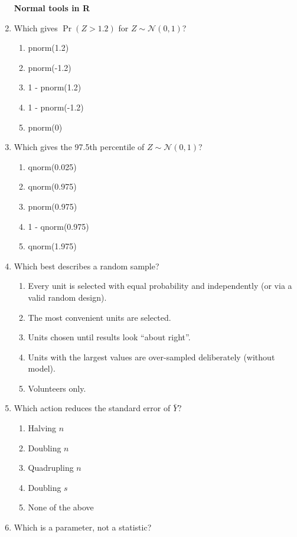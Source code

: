 \documentclass{article}
\begin{document}
\begin{enumerate}
\textbf{Normal tools in R}\\
\item Which gives $\Pr(Z>1.2)$ for $Z\sim\mathcal N(0,1)$?
    \begin{enumerate}[label=\Alph*.]
        \item pnorm(1.2)
        \item pnorm(-1.2)
        \item 1 - pnorm(1.2)
        \item 1 - pnorm(-1.2)
        \item pnorm(0)
    \end{enumerate}
\item Which gives the 97.5th percentile of $Z\sim\mathcal N(0,1)$?
    \begin{enumerate}[label=\Alph*.]
        \item qnorm(0.025)
        \item qnorm(0.975)
        \item pnorm(0.975)
        \item 1 - qnorm(0.975)
        \item qnorm(1.975)
    \end{enumerate}
\item Which best describes a random sample?
    \begin{enumerate}[label=\Alph*.]
        \item Every unit is selected with equal probability and independently (or via a valid random design).
        \item The most convenient units are selected.
        \item Units chosen until results look ``about right''.
        \item Units with the largest values are over-sampled deliberately (without model).
        \item Volunteers only.
    \end{enumerate}
\item Which action reduces the standard error of $\bar Y$?
    \begin{enumerate}[label=\Alph*.]
        \item Halving $n$
        \item Doubling $n$
        \item Quadrupling $n$
        \item Doubling $s$
        \item None of the above
    \end{enumerate}
\item Which is a parameter, not a statistic?

\end{enumerate}
\end{document}

